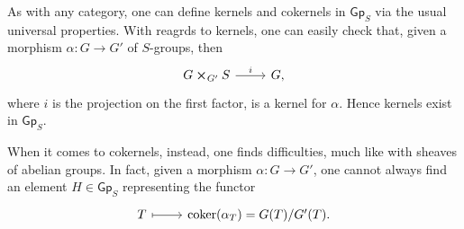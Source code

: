 \documentclass[../Main]{subfiles}
\begin{document}
\begin{rem}
	As with any category, one can define kernels and cokernels 
	in $\mathsf{Gp}_S$ via the usual universal properties.
	With reagrds to kernels, one can easily check that, given a morphism
	$\alpha\colon G \to G'$ of $S$-groups, then 
	\begin{equation*}
	\begin{tikzcd}
		G \cross_{ G' } S \arrow[r, "i", rightarrow] &
		G,
	\end{tikzcd}
	\end{equation*} 
	where $i$ is the projection on the first factor, is a kernel for $\alpha$.
	Hence kernels exist in $\mathsf{Gp}_S$.
	
	When it comes to cokernels, instead, one finds difficulties, much like
	with sheaves of abelian groups.
	In fact, given a morphism $\alpha\colon G \to G'$, one cannot always find an
	element $H \in \mathsf{Gp}_S$ representing the functor
	\begin{equation*}
	\begin{tikzcd}
		T \arrow[r, "", mapsto] &
		\coker (\alpha_T) =
		G(T)/G'(T).
	\end{tikzcd}
	\end{equation*}
\end{rem}
\end{document}
